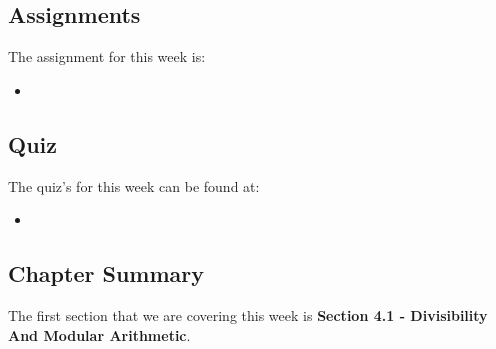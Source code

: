 \subsection{Assignments}

The assignment for this week is:

\begin{itemize}
    \item {}
\end{itemize}

\subsection{Quiz}

The quiz's for this week can be found at:

\begin{itemize}
    \item {}
\end{itemize}

\newpage

\subsection{Chapter Summary}

The first section that we are covering this week is \textbf{Section 4.1 - Divisibility And Modular Arithmetic}. 

